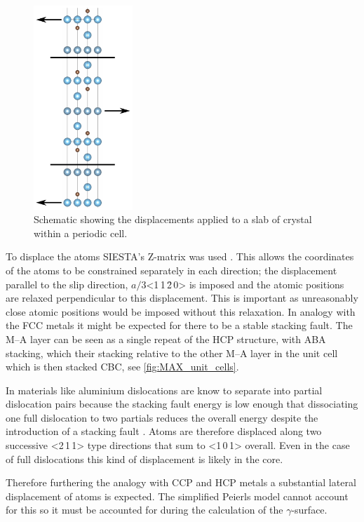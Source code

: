 \begin{figure}
\centering
\captionsetup{width=0.45\textwidth}
\includegraphics[width=0.3333\textwidth]{displacements_for_gamma_surface}
\caption{Schematic showing the displacements applied to a slab of crystal within a periodic cell. \label{fig:DFT_gamma_surface}}
\end{figure}

To displace the atoms SIESTA's Z-matrix was used \cite{SIESTA_manual}. This allows the coordinates of the atoms to be constrained separately in each direction; the displacement parallel to the slip direction, $a/3$<1\,1\,\={2}\,0> is imposed and the atomic positions are relaxed perpendicular to this displacement. This is important as unreasonably close atomic positions would be imposed without this relaxation. In analogy with the FCC metals it might be expected for there to be a stable stacking fault. The M--A layer can be seen as a single repeat of the HCP structure, with ABA stacking, which their stacking relative to the other M--A layer in the unit cell which is then stacked CBC, see \autoref{fig:MAX_unit_cells}. 

In materials like aluminium dislocations are know to separate into partial dislocation pairs because the stacking fault energy is low enough that dissociating one full dislocation to two partials reduces the overall energy despite the introduction of a stacking fault \cite{kelly2012ch9}. Atoms are therefore displaced along two successive <2\,1\,1> type directions that sum to <1\,0\,1> overall. Even in the case of full dislocations this kind of displacement is likely in the core.

Therefore furthering the analogy with CCP and HCP metals a substantial lateral displacement of atoms is expected. The simplified Peierls model cannot account for this so it must be accounted for during the calculation of the $\gamma$-surface.

